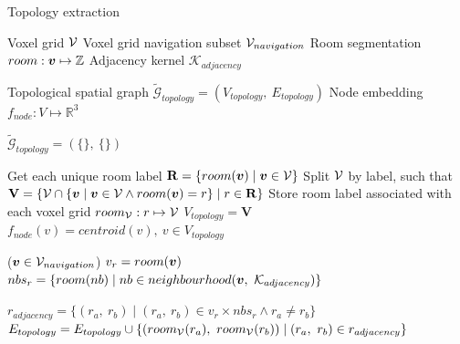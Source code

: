 \begin{algorithm}
    \caption{Topology extraction}
    \begin{algorithmic}

    \Require \quad Voxel grid \(\mathcal{V}\)
    \Require \quad Voxel grid navigation subset \(\mathcal{V}_{navigation}\)
    \Require \quad Room segmentation \(room: \boldsymbol{v} \mapsto \mathbb{Z}\)
    \Require \quad Adjacency kernel $\mathcal{K}_{adjacency}$

    \Ensure \quad Topological spatial graph \(\widetilde{\mathcal{G}}_{topology} = (V_{topology},\ E_{topology})\)
    \Ensure \quad Node embedding \(f_{node}: V \mapsto \mathbb{R}^3\)

    \State $\widetilde{\mathcal{G}}_{topology} = (\{\},\ \{\})$

    \State Get each unique room label \(\mathbf{R} = \{room(\boldsymbol{v}) \mid \boldsymbol{v} \in \mathcal{V}\}\)
    \State Split \(\mathcal{V}\) by label, such that \(\mathbf{V} = \{\mathcal{V} \cap \{\boldsymbol{v} \mid \boldsymbol{v} \in \mathcal{V} \land room(\boldsymbol{v}) = r\} \mid r \in \mathbf{R}\}\)
    \State Store room label associated with each voxel grid \(room_{\mathcal{V}}: r \mapsto \mathcal{V}\)
    \State $V_{topology} = \mathbf{V}$
    \State $f_{node}(v) = centroid(v),\ v \in V_{topology}$

    \ForEach($\boldsymbol{v} \in \mathcal{V}_{navigation}$)
        \State $v_r = room(\boldsymbol{v})$
        \State $nbs_r = \{room(nb) \mid nb \in neighbourhood(\boldsymbol{v},\ \mathcal{K}_{adjacency})\}$

        \State $r_{adjacency} = \{(r_a,\ r_b) \mid (r_a,\ r_b) \in {v_r} \times {nbs_r} \land r_a \neq r_b\}$
        \State $E_{topology} = E_{topology} \cup \{(room_{\mathcal{V}}(r_a),\ room_{\mathcal{V}}(r_b)) \mid (r_a,\ r_b) \in r_{adjacency}\}$
    \EndFor
    \end{algorithmic}
\end{algorithm}